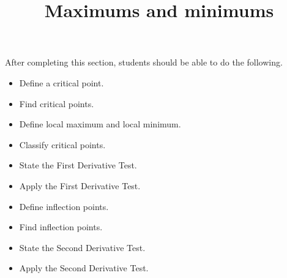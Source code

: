 \documentclass{ximera}
\title{Maximums and minimums}
\begin{document}
\begin{abstract}
\end{abstract}
\maketitle

\begin{sectionOutcomes}

After completing this section, students should be able to do the following.

\begin{itemize}
	\item Define a critical point.
	\item Find critical points.
	\item Define local maximum and local minimum.
	\item Classify critical points.
	\item State the First Derivative Test.
	\item Apply the First Derivative Test.
	\item Define inflection points.
	\item Find inflection points.
	\item State the Second Derivative Test.
	\item Apply the Second Derivative Test.
\end{itemize}
\end{sectionOutcomes}
\end{document}
